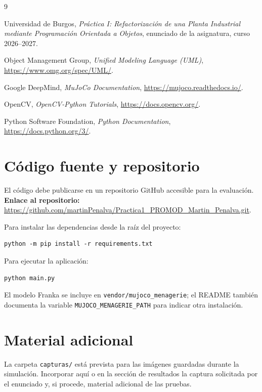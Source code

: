 \documentclass[12pt,a4paper]{article}
\begin{document}
\begin{thebibliography}{9}

Universidad de Burgos,
\textit{Práctica I: Refactorización de una Planta Industrial mediante
Programación Orientada a Objetos}, enunciado de la asignatura,
curso 2026--2027.

Object Management Group, \textit{Unified Modeling Language (UML)},
\url{https://www.omg.org/spec/UML/}.

Google DeepMind, \textit{MuJoCo Documentation},
\url{https://mujoco.readthedocs.io/}.

OpenCV, \textit{OpenCV-Python Tutorials},
\url{https://docs.opencv.org/}.

Python Software Foundation, \textit{Python Documentation},
\url{https://docs.python.org/3/}.

\end{thebibliography}


\newpage
\appendix

\section{Código fuente y repositorio}

El código debe publicarse en un repositorio GitHub accesible para la evaluación.
\textbf{Enlace al repositorio:}
\url{https://github.com/martinPenalva/Practica1_PROMOD_Martin_Penalva.git}.

Para instalar las dependencias desde la raíz del proyecto:
\begin{verbatim}
python -m pip install -r requirements.txt
\end{verbatim}

Para ejecutar la aplicación:
\begin{verbatim}
python main.py
\end{verbatim}

El modelo Franka se incluye en \texttt{vendor/mujoco\_menagerie}; el README
también documenta la variable \texttt{MUJOCO\_MENAGERIE\_PATH} para indicar
otra instalación.

\section{Material adicional}

La carpeta \texttt{capturas/} está prevista para las imágenes guardadas durante
la simulación. Incorporar aquí o en la sección de resultados la captura
solicitada por el enunciado y, si procede, material adicional de las pruebas.
\end{document}
